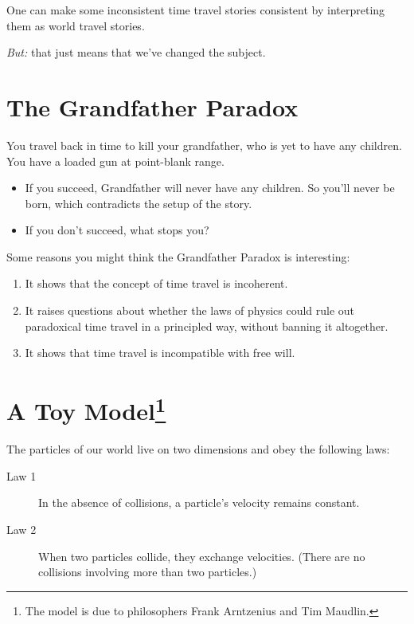 \documentclass[12pt]{extarticle}
\begin{document}
One can make some inconsistent time travel stories consistent by interpreting them as world travel stories. 

\vspace{3mm}
\noindent
\emph{But:} that just means that we've changed the subject.


\section{The Grandfather Paradox}


You travel back in time to kill your grandfather, who is yet to have any children. You have a loaded gun at point-blank range. 

\begin{itemize}

\item If you succeed, Grandfather will never have any children. So you'll never be born, which contradicts the setup of the story.

\item If you don't succeed, what stops you?


\end{itemize}
Some reasons you might think the Grandfather Paradox is interesting:

\begin{enumerate}

\item It shows that the concept of time travel is incoherent.

\item It raises questions about whether the laws of physics could rule out paradoxical time travel in a principled way, without banning it altogether.


\item It shows that time travel is incompatible with free will.


\end{enumerate}



\section{A Toy Model\footnote{The model is due to philosophers Frank Arntzenius and Tim Maudlin.}}

The particles of our world live on two dimensions and obey the following laws:
\begin{description}
\item[Law 1]  In the absence of collisions, a particle's velocity remains constant.


\item[Law 2] When two particles collide, they exchange velocities. (There are no collisions involving more than two particles.)

\end{description}
\end{document}
